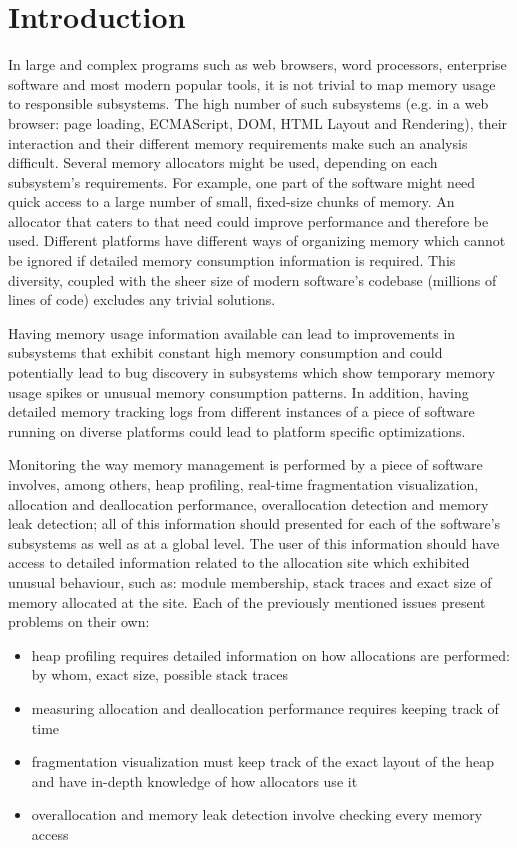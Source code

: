 \chapter{Introduction}
\label{chapter:intro}

	In large and complex programs such as web browsers, word processors, enterprise software and most modern popular tools, it is not trivial to map memory usage to responsible subsystems. The high number of such subsystems (e.g. in a web browser: page loading, ECMAScript, DOM, HTML Layout and Rendering), their interaction and their different memory requirements make such an analysis difficult. Several memory allocators might be used, depending on each subsystem's requirements. For example, one part of the software might need quick access to a large number of small, fixed-size chunks of memory. An allocator that caters to that need could improve performance and therefore be used. Different platforms have different ways of organizing memory which cannot be ignored if detailed memory consumption information is required. This diversity, coupled with the sheer size of modern software's codebase (millions of lines of code) excludes any trivial solutions.

	Having memory usage information available can lead to improvements in subsystems that exhibit constant high memory consumption and could potentially lead to bug discovery in subsystems which show temporary memory usage spikes or unusual memory consumption patterns. In addition, having detailed memory tracking logs from different instances of a piece of software running on diverse platforms could lead to platform specific optimizations. 

	Monitoring the way memory management is performed by a piece of software involves, among others, heap profiling, real-time fragmentation visualization, allocation and deallocation performance, overallocation detection and memory leak detection; all of this information should presented for each of the software's subsystems as well as at a global level. The user of this information should have access to detailed information related to the allocation site which exhibited unusual behaviour, such as: module membership, stack traces and exact size of memory allocated at the site. Each of the previously mentioned issues present problems on their own:
\begin{itemize}
\item heap profiling requires detailed information on how allocations are performed: by whom, exact size, possible stack traces
\item measuring allocation and deallocation performance requires keeping track of time
\item fragmentation visualization must keep track of the exact layout of the heap and have in-depth knowledge of how allocators use it
\item overallocation and memory leak detection involve checking every memory access
\end{itemize}

